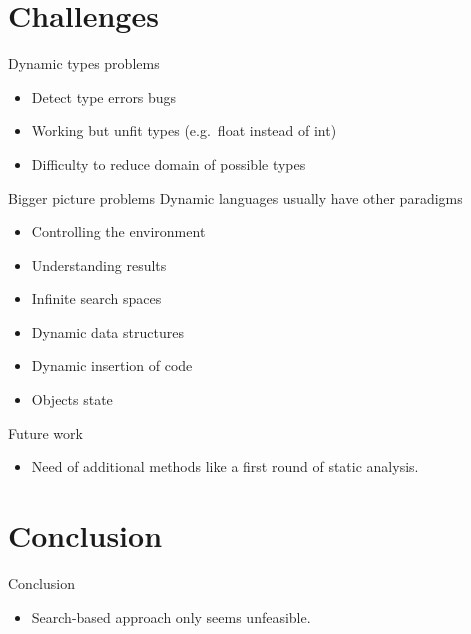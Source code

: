 \documentclass{beamer}
\begin{document}
\section{Challenges}

\begin{frame}{Dynamic types problems}
  \begin{itemize}
    \item Detect type errors bugs
    \item Working but unfit types (e.g.\ float instead of int)
    \item Difficulty to reduce domain of possible types
  \end{itemize}
\end{frame}

\begin{frame}{Bigger picture problems}
  Dynamic languages usually have other paradigms

  \begin{itemize}
    \item Controlling the environment
    \item Understanding results
    \item Infinite search spaces
    \item Dynamic data structures
    \item Dynamic insertion of code
    \item Objects state
  \end{itemize}
\end{frame}

\begin{frame}{Future work}
  \begin{itemize}
    \item Need of additional methods like a first round of static analysis.
  \end{itemize}
\end{frame}


\section*{Conclusion}

\begin{frame}{Conclusion}
  \begin{itemize}
    \item Search-based approach only seems unfeasible.
  \end{itemize}
\end{frame}
\end{document}

